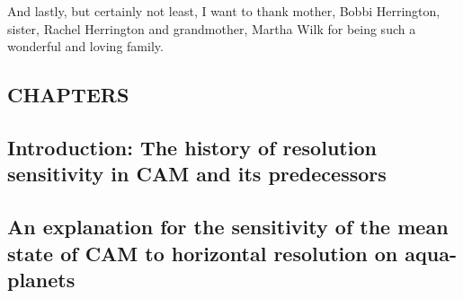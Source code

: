 \documentclass[12pt]{article}
\begin{document}
And lastly, but certainly not least, I want to thank mother, Bobbi Herrington, sister, Rachel Herrington and grandmother, Martha Wilk for being such a wonderful and loving family.

\newpage
{}

\newpage
\begin{center}
\section*{\bf{\normalsize CHAPTERS}}
\end{center}

\newpage
\begin{center}
\section{Introduction: The history of resolution sensitivity in CAM and its predecessors}\label{sec:chapter1}
\end{center}


\newpage
\begin{center}
\section{An explanation for the sensitivity of the mean state of CAM to horizontal resolution on aqua-planets}\label{sec:chapter2}
\end{center}

\end{document}
